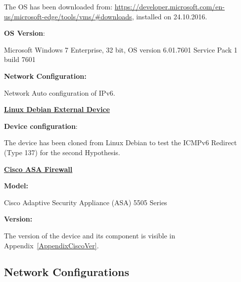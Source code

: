 \documentclass[12pt]{article}
\begin{document}
The OS has been downloaded from: \url{https://developer.microsoft.com/en-us/microsoft-edge/tools/vms/#downloads}, installed on 24.10.2016.

\textbf{OS Version}:

\vspace{-10pt}
Microsoft Windows 7 Enterprise, 32 bit, OS version 6.01.7601 Service Pack 1 build 7601

\textbf{Network Configuration:}

\vspace{-10pt}
Network Auto configuration of IPv6.

\textbf{\underline{Linux Debian External Device}}

\vspace{-10pt}
\textbf{Device configuration}:

\begin{savenotes}
\begin{table}[!htpb]
\centering
\addtolength{\tabcolsep}{1pt}
\noindent{}
\caption{Linux Debian External}
\label{table:linuxDebExt}
\end{table}
\end{savenotes}

The device has been cloned from Linux Debian to test the ICMPv6 Redirect (Type 137) for the second Hypothesis.

\textbf{\underline{Cisco ASA Firewall}}

\vspace{-10pt}
\textbf{Model:} 

\vspace{-15pt}
Cisco Adaptive Security Appliance (ASA) 5505 Series

\textbf{Version:}

\vspace{-10pt}
The version of the device and its component is visible in Appendix~\ref{AppendixCiscoVer}.


\subsection{Network Configurations}
\label{subsection:netConfigurations}
\end{document}

